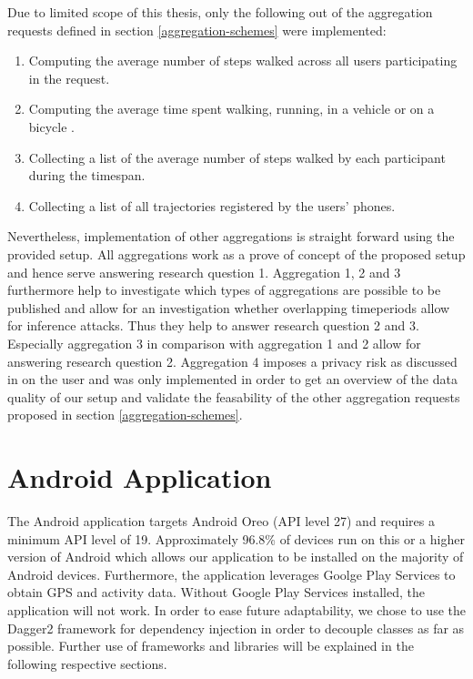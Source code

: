\begin{samepage}
Due to limited scope of this thesis, only the following out of the aggregation requests defined in section \ref{aggregation-schemes} were implemented:
\begin{enumerate}
	\item Computing the average number of steps walked across all users participating in the request.
	\item Computing the average time spent walking, running, in a vehicle or on a bicycle \parencite{detected-activity}.
	\item Collecting a list of the average number of steps walked by each participant during the timespan.
	\item Collecting a list of all trajectories registered by the users' phones.
\end{enumerate}
\end{samepage}

Nevertheless, implementation of other aggregations is straight forward using the provided setup.
All aggregations work as a prove of concept of the proposed setup and hence serve answering research question 1. Aggregation 1, 2 and 3 furthermore help to investigate which types of aggregations are possible to be published and allow for an investigation whether overlapping timeperiods allow for inference attacks. Thus they help to answer research question 2 and 3. Especially aggregation 3 in comparison with aggregation 1 and 2 allow for answering research question 2.
Aggregation 4 imposes a privacy risk as discussed in \parencite{twitter, cellphone, krumm} on the user and was only implemented in order to get an overview of the data quality of our setup and validate the feasability of the other aggregation requests proposed in section \ref{aggregation-schemes}.

\section{Android Application}
The Android application targets Android Oreo (API level 27) and requires a minimum API level of 19. Approximately 96.8\% of devices run on this or a higher version of Android \cite{android-api-level-share} which allows our application to be installed on the majority of Android devices.
Furthermore, the application leverages Goolge Play Services to obtain GPS and activity data. Without Google Play Services installed, the application will not work. In order to ease future adaptability, we chose to use the Dagger2 framework \parencite{dagger} for dependency injection in order to decouple classes as far as possible. Further use of frameworks and libraries will be explained in the following respective sections.

